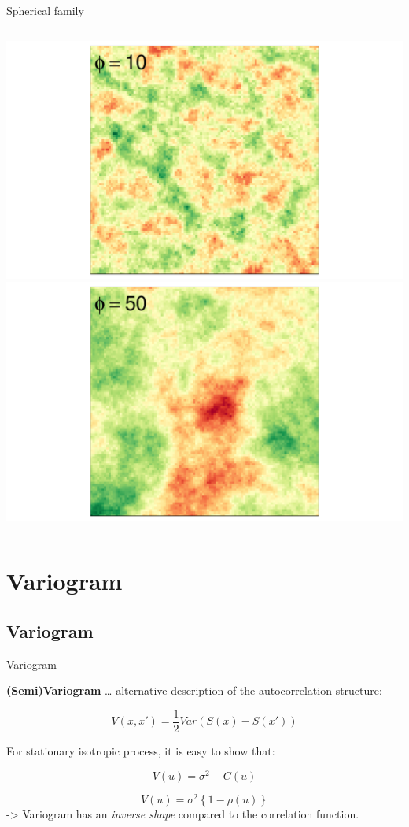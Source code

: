 \documentclass[
  ignorenonframetext,
]{beamer}
\begin{document}
\begin{frame}{Spherical family}
\begin{columns}[T]
\begin{column}{0.5\textwidth}
\includegraphics{Lecture_1_files/figure-beamer/unnamed-chunk-45-1.pdf}
\includegraphics{Lecture_1_files/figure-beamer/unnamed-chunk-46-1.pdf}
\end{column}
\end{columns}
\end{frame}

\hypertarget{variogram}{%
\section{Variogram}\label{variogram}}

\hypertarget{variogram-1}{%
\subsection{Variogram}\label{variogram-1}}

\begin{frame}{Variogram}
\small

\textbf{(Semi)Variogram} \ldots{} alternative description of the
autocorrelation structure:

\[V(x,x')=\frac{1}{2}Var\left(S(x)-S(x')\right)\]

For stationary isotropic process, it is easy to show that:

\[V(u) = \sigma^2 - C(u)\]

\[V(u)=\sigma^2\left\{1-\rho(u)\right\}\] -\textgreater{} Variogram has
an \emph{inverse shape} compared to the correlation function.
\end{frame}
\end{document}
